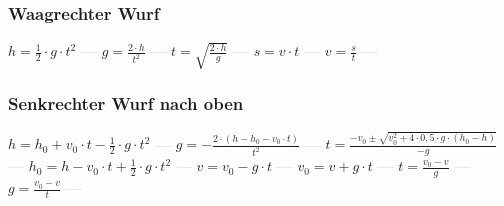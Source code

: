 \subsubsection{Waagrechter Wurf} 
\begin{minipage}{0.45\textwidth} 
\end{minipage} 
\begin{minipage}{0.45\textwidth} 
 
\end{minipage} 
$ h = \frac{1}{2}\cdot g\cdot t^{2} $ \textcolor{lightgray}{\textbf{---}} 
$ g = \frac{2\cdot h}{t^{2} } $ \textcolor{lightgray}{\textbf{---}} 
$ t = \sqrt{\frac{2\cdot h}{g}} $ \textcolor{lightgray}{\textbf{---}} 
$ s = v\cdot t $ \textcolor{lightgray}{\textbf{---}} 
$ v = \frac{s}{t} $ \textcolor{lightgray}{\textbf{---}} 

\subsubsection{Senkrechter Wurf nach oben} 
\begin{minipage}{0.45\textwidth} 
\end{minipage} 
\begin{minipage}{0.45\textwidth} 
 
\end{minipage} 
$ h = h_{0}  + v_{0} \cdot t - \frac{1}{2}\cdot g\cdot t^{2} $ \textcolor{lightgray}{\textbf{---}} 
$ g = - \frac{2\cdot (h - h_{0}  - v_{0} \cdot t)}{     t^{2} } $ \textcolor{lightgray}{\textbf{---}} 
$ t = \frac{-v_{0}  \pm \sqrt{v_{0} ^{2} +4\cdot 0,5\cdot g\cdot (h_{0}  -h)}}{      -g} $ \textcolor{lightgray}{\textbf{---}} 
$ h_{0}  = h - v_{0} \cdot t + \frac{1}{2}\cdot g\cdot t^{2} $ \textcolor{lightgray}{\textbf{---}} 
$ v = v_{0}  - g\cdot t $ \textcolor{lightgray}{\textbf{---}} 
$ v_{0}  = v + g\cdot t $ \textcolor{lightgray}{\textbf{---}} 
$ t = \frac{v_{0} -v}{  g} $ \textcolor{lightgray}{\textbf{---}} 
$ g = \frac{v_{0}  - v}{  t} $ \textcolor{lightgray}{\textbf{---}} 


